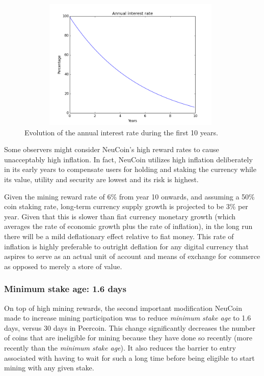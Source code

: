\documentclass[a4paper,11pt]{article}
\begin{document}
\begin{figure}[H]
\centering
\includegraphics[width=110mm,height=63mm]{04_rates.png}
\caption{Evolution of the annual interest rate during the first 10 years.}
\end{figure}


Some observers might consider NeuCoin's high reward rates to cause unacceptably high inflation. In fact, NeuCoin utilizes high inflation deliberately in its early years to compensate users for holding and staking the currency while its value, utility and security are lowest and its risk is highest.

Given the mining reward rate of 6\% from year 10 onwards, and assuming a 50\% coin staking rate, long-term currency supply growth is projected to be 3\% per year. Given that this is slower than fiat currency monetary growth (which averages the rate of economic growth plus the rate of inflation), in the long run there will be a mild deflationary effect relative to fiat money. This rate of inflation is highly preferable to outright deflation for any digital currency that aspires to serve as an actual unit of account and means of exchange for commerce as opposed to merely a store of value.

\subsubsection*{Minimum stake age: 1.6 days}

On top of high mining rewards, the second important modification NeuCoin made to increase mining participation was to reduce \textit{minimum stake age} to 1.6 days, versus 30 days in Peercoin. This change significantly decreases the number of coins that are ineligible for mining because they have done so recently (more recently than the \textit{minimum stake age}). It also reduces the barrier to entry associated with having to wait for such a long time before being eligible to start mining with any given stake.
\end{document}
